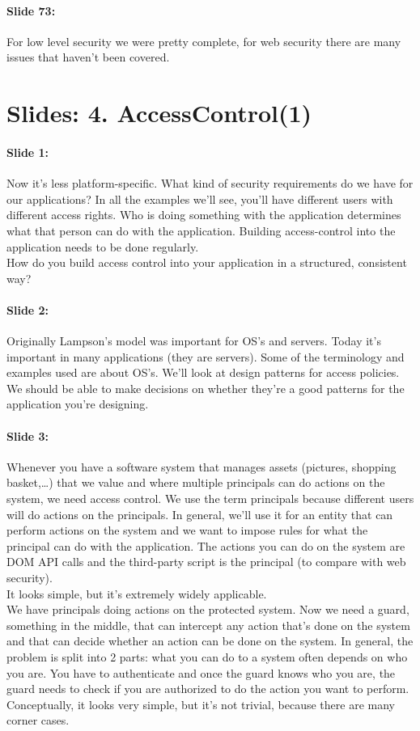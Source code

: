 \documentclass[10pt,a4paper]{report}
\begin{document}
\paragraph{Slide 73:} For low level security we were pretty complete, for web security there are many issues that haven't been covered. 

\section{Slides: 4. AccessControl(1)}

\paragraph{Slide 1:} Now it's less platform-specific. What kind of security requirements do we have for our applications? In all the examples we'll see, you'll have different users with different access rights. Who is doing something with the application determines what that person can do with the application. Building access-control into the application needs to be done regularly.\\
How do you build access control into your application in a structured, consistent way?

\paragraph{Slide 2:} Originally Lampson's model was important for OS's and servers. Today it's important in many applications (they are servers). Some of the terminology and examples used are about OS's. We'll look at design patterns for access policies. We should be able to make decisions on whether they're a good patterns for the application you're designing. 

\paragraph{Slide 3:} Whenever you have a software system that manages assets (pictures, shopping basket,…) that we value and where multiple principals can do actions on the system, we need access control. We use the term principals because different users will do actions on the principals. In general, we'll use it for an entity that can perform actions on the system and we want to impose rules for what the principal can do with the application. The actions you can do on the system are DOM API calls and the third-party script is the principal (to compare with web security). \\
It looks simple, but it's extremely widely applicable.\\
We have principals doing actions on the protected system. Now we need a guard, something in the middle, that can intercept any action that's done on the system and that can decide whether an action can be done on the system. In general, the problem is split into 2 parts: what you can do to a system often depends on who you are. You have to authenticate and once the guard knows who you are, the guard needs to check if you are authorized to do the action you want to perform.\\ 
Conceptually, it looks very simple, but it's not trivial, because there are many corner cases.
\end{document}
